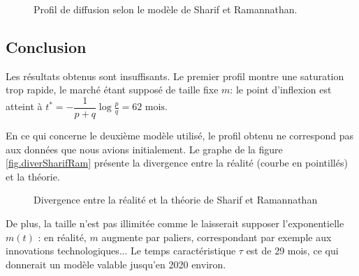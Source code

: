 		\begin{figure}[!h]
			\centering
			\caption{Profil de diffusion selon le modèle de Sharif et Ramannathan.\label{fig.SharifRaman}}
		\end{figure}
		
	\subsection{Conclusion}
		
		Les résultats obtenus sont insuffisants. Le premier profil montre une saturation trop rapide, le marché étant supposé de taille fixe $m$: le point d'inflexion est atteint à $t^* = -\dfrac{1}{p+q} \log{\frac{p}{q}} = 62 \text{ mois}$.

		En ce qui concerne le deuxième modèle utilisé, le profil obtenu ne correspond pas aux données que nous avions initialement. Le graphe de la figure \vref{fig.diverSharifRam} présente la divergence entre la réalité (courbe en pointillés) et la théorie.
		
		\begin{figure}[!h]
			\centering
			\caption{Divergence entre la réalité et la théorie de Sharif et Ramannathan \label{fig.diverSharifRam}}
		\end{figure}
		
		De plus, la taille n'est pas illimitée comme le laisserait supposer l'exponentielle $m(t)$ : en réalité, $m$ augmente par paliers, correspondant par exemple aux innovations technologiques... Le temps caractéristique $\tau$ est de 29 mois, ce qui donnerait un modèle valable jusqu'en 2020 environ.
		
